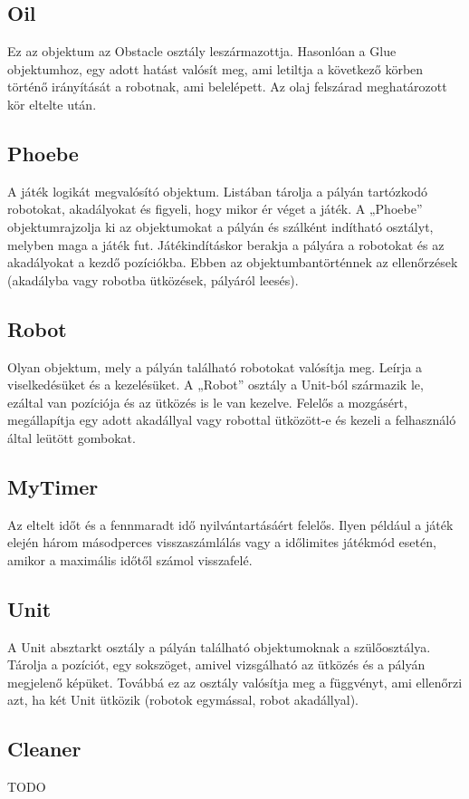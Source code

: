 \subsection{Oil}
Ez az objektum az Obstacle osztály leszármazottja. Hasonlóan a Glue objektumhoz, egy adott hatást valósít meg, ami letiltja a következő körben történő irányítását a robotnak, ami belelépett. Az olaj felszárad meghatározott kör eltelte után.
\subsection{Phoebe}
A játék logikát megvalósító objektum. Listában tárolja a pályán tartózkodó robotokat, akadályokat és figyeli, hogy mikor ér véget a játék. A „Phoebe” objektumrajzolja ki az objektumokat a pályán és szálként indítható osztályt, melyben maga a játék fut. Játékindításkor berakja a pályára a robotokat és az akadályokat a kezdő pozíciókba. Ebben az objektumbantörténnek az ellenőrzések (akadályba vagy robotba ütközések, pályáról leesés).
\subsection{Robot}
Olyan objektum, mely a pályán található robotokat valósítja meg. Leírja a viselkedésüket és a kezelésüket. A „Robot” osztály a Unit-ból származik le, ezáltal van pozíciója és az ütközés is le van kezelve. Felelős a mozgásért, megállapítja egy adott akadállyal vagy robottal ütközött-e és kezeli a felhasználó által leütött gombokat.

\subsection{MyTimer}
Az eltelt időt és a fennmaradt idő nyilvántartásáért felelős. Ilyen például a játék elején három másodperces visszaszámlálás vagy a időlimites játékmód esetén, amikor a maximális időtől számol visszafelé. 
\subsection{Unit}
A Unit absztarkt osztály a pályán található objektumoknak a szülőosztálya. Tárolja a pozíciót, egy sokszöget, amivel vizsgálható az ütközés és a pályán megjelenő képüket. Továbbá ez az osztály valósítja meg a függvényt, ami ellenőrzi azt, ha két Unit ütközik (robotok egymással, robot akadállyal).

\subsection{Cleaner}
TODO
